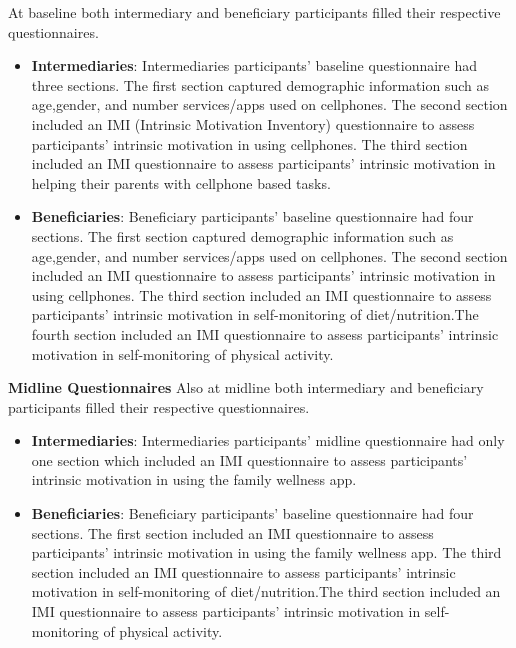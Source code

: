 At baseline both intermediary and beneficiary participants filled their respective questionnaires. 
\begin{itemize}
\item{\textbf{Intermediaries}}: Intermediaries participants' baseline questionnaire had three sections. The first section captured demographic information such as age,gender, and number services/apps used on cellphones. The second section included an IMI (Intrinsic Motivation Inventory) questionnaire  to assess participants' intrinsic motivation in using cellphones. The third section included an IMI questionnaire to assess participants' intrinsic motivation in helping their parents with cellphone based tasks.
\item{\textbf{Beneficiaries}}: Beneficiary participants' baseline questionnaire had four sections. The first section captured demographic information such as age,gender, and number services/apps used on cellphones. The second section included an IMI questionnaire to assess participants' intrinsic motivation in using cellphones. The third section included an IMI questionnaire to assess participants' intrinsic motivation in self-monitoring of diet/nutrition.The fourth section included an IMI questionnaire to assess participants' intrinsic motivation in self-monitoring of physical activity.
\end{itemize}
\textbf{Midline Questionnaires}
Also at midline both intermediary and beneficiary participants filled their respective questionnaires. 
\begin{itemize}
\item{\textbf{Intermediaries}}: Intermediaries participants' midline questionnaire had only one section which included an IMI questionnaire  to assess participants' intrinsic motivation in using the family wellness app.
\item{\textbf{Beneficiaries}}: Beneficiary participants' baseline questionnaire had four sections. The first section included an IMI questionnaire  to assess participants' intrinsic motivation in using the family wellness app. The third section included an IMI questionnaire to assess participants' intrinsic motivation in self-monitoring of diet/nutrition.The third section included an IMI questionnaire to assess participants' intrinsic motivation in self-monitoring of physical activity.
\end{itemize}

